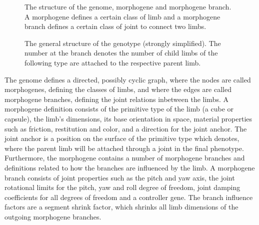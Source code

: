 \documentclass[main]{subfiles}
\begin{document}
\begin{figure}[H]
\caption{The structure of the genome, morphogene and morphogene branch. A morphogene defines a certain class of limb and a morphogene branch defines a certain class of joint to connect two limbs.}
\end{figure}


\begin{figure}[H]
\center
{}
\caption{The general structure of the genotype (strongly simplified). The number at the branch denotes the number of child limbs of the following type are attached to the respective parent limb.}
\label{figure:genotype}
\end{figure}

The genome defines a directed, possibly cyclic graph, where the nodes are called morphogenes, defining the classes of limbs, and where the edges are called morphogene branches, defining the joint relations inbetween the limbs. A morphogene definition consists of the primitive type of the limb (a cube or capsule), the limb's dimensions, its base orientation in space, material properties such as friction, restitution and color, and a direction for the joint anchor. The joint anchor is a position on the surface of the primitive type which denotes, where the parent limb will be attached through a joint in the final phenotype. Furthermore, the morphogene contains a number of morphogene branches and definitions related to how the branches are influenced by the limb. A morphogene branch consists of joint properties such as the pitch and yaw axis, the joint rotational limits for the pitch, yaw and roll degree of freedom, joint damping coefficients for all degrees of freedom and a controller gene.
The branch influence factors are a segment shrink factor, which shrinks all limb dimensions of the outgoing morphogene branches.
\end{document}
